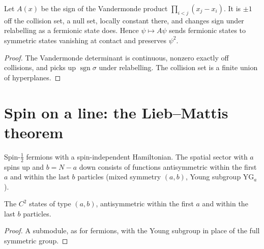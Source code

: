 \begin{theorem}
  \label{thm:line_hardcore}
  \leanok
  Let $A(x)$ be the sign of the Vandermonde product $\prod_{i<j}(x_j-x_i)$. It is $\pm1$ off the collision set, a
  null set, locally constant there, and changes sign under relabelling as a fermionic state does. Hence $\psi\mapsto
  A\psi$ sends fermionic states to symmetric states vanishing at contact and preserves $\psi^2$.
\end{theorem}
\begin{proof}
  \leanok
  The Vandermonde determinant is continuous, nonzero exactly off collisions, and picks up $\operatorname{sgn}\sigma$
  under relabelling. The collision set is a finite union of hyperplanes.
\end{proof}

\section{Spin on a line: the Lieb--Mattis theorem}

Spin-$\tfrac12$ fermions with a spin-independent Hamiltonian. The spatial sector with $a$ spins up and $b=N-a$
down consists of functions antisymmetric within the first $a$ and within the last $b$ particles (mixed symmetry
$(a,b)$, Young subgroup $\mathrm{YG}_a$).

\begin{lemma}
  \label{lem:line_mixed}
  \leanok
  The $C^2$ states of type $(a,b)$, antisymmetric within the first $a$ and within the last $b$ particles.
\end{lemma}
\begin{proof}
  \leanok
  A submodule, as for fermions, with the Young subgroup in place of the full symmetric group.
\end{proof}

